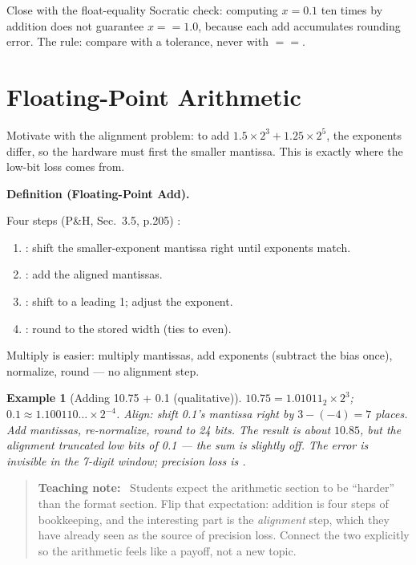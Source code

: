 \documentclass[11pt]{article}
\newtheorem{example}{Example}[section]
\newenvironment{definitionbox}[1]{%
  \par\noindent\textbf{Definition (#1).}\ \itshape
}{\par\vspace{0.3em}}
\newenvironment{teachingaside}{\begin{quote}\small\color{primary-gold}\textbf{Teaching note:}\ }{\end{quote}}
\begin{document}
Close with the float-equality Socratic check: computing $x = 0.1$ ten times by addition does not guarantee $x == 1.0$, because each add accumulates rounding error. The rule: compare with a tolerance, never with $==$.

\section{Floating-Point Arithmetic}

Motivate with the alignment problem: to add $1.5\times2^3 + 1.25\times2^5$, the exponents differ, so the hardware must first  the smaller mantissa. This is exactly where the low-bit loss comes from.

\begin{definitionbox}{Floating-Point Add}
Four steps (P\&H, Sec.~3.5, p.205) \cite{PattersonHennessy2017_computer_organization_design}:
\begin{enumerate}
  \item {}: shift the smaller-exponent mantissa right until exponents match.
  \item {}: add the aligned mantissas.
  \item {}: shift to a leading 1; adjust the exponent.
  \item {}: round to the stored width (ties to even).
\end{enumerate}
\end{definitionbox}

Multiply is easier: multiply mantissas, add exponents (subtract the bias once), normalize, round --- no alignment step.

\begin{example}[Adding 10.75 + 0.1 (qualitative)]
$10.75 = 1.01011_2 \times 2^3$; $0.1 \approx 1.100110\ldots \times 2^{-4}$. Align: shift 0.1's mantissa right by $3-(-4)=7$ places. Add mantissas, re-normalize, round to 24 bits. The result is about $10.85$, but the alignment truncated low bits of 0.1 --- the sum is slightly off. The error is invisible in the 7-digit window; precision loss is .
\end{example}

\begin{teachingaside}
Students expect the arithmetic section to be ``harder'' than the format section. Flip that expectation: addition is four steps of bookkeeping, and the interesting part is the \emph{alignment} step, which they have already seen as the source of precision loss. Connect the two explicitly so the arithmetic feels like a payoff, not a new topic.
\end{teachingaside}
\end{document}
